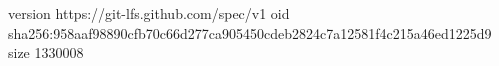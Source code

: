 version https://git-lfs.github.com/spec/v1
oid sha256:958aaf98890cfb70c66d277ca905450cdeb2824c7a12581f4c215a46ed1225d9
size 1330008
